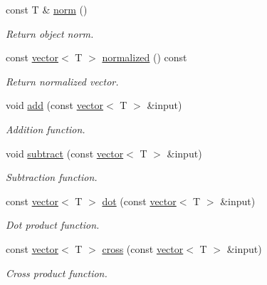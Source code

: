\begin{DoxyCompactItemize}
\mbox{\label{classddd_1_1vector_a77aea495c4aeaf8645d4ef94d1a0afb2}} 
const T \& \hyperlink{classddd_1_1vector_a77aea495c4aeaf8645d4ef94d1a0afb2}{norm} ()
\begin{DoxyCompactList}\small\item\em Return object norm. \end{DoxyCompactList}\item 
\mbox{\label{classddd_1_1vector_a40b593b08a2dd6af92c5c07bb9faa463}} 
const \hyperlink{classddd_1_1vector}{vector}$<$ T $>$ \hyperlink{classddd_1_1vector_a40b593b08a2dd6af92c5c07bb9faa463}{normalized} () const
\begin{DoxyCompactList}\small\item\em Return normalized vector. \end{DoxyCompactList}\item 
void \hyperlink{classddd_1_1vector_a97eca6a6625002022ab2442b5cbd0462}{add} (const \hyperlink{classddd_1_1vector}{vector}$<$ T $>$ \&input)
\begin{DoxyCompactList}\small\item\em Addition function. \end{DoxyCompactList}\item 
void \hyperlink{classddd_1_1vector_abf367c7da55ad2c770a90a3ed3c01d5a}{subtract} (const \hyperlink{classddd_1_1vector}{vector}$<$ T $>$ \&input)
\begin{DoxyCompactList}\small\item\em Subtraction function. \end{DoxyCompactList}\item 
const \hyperlink{classddd_1_1vector}{vector}$<$ T $>$ \hyperlink{classddd_1_1vector_a61e3ccdb85f4d41c142c80b429808baf}{dot} (const \hyperlink{classddd_1_1vector}{vector}$<$ T $>$ \&input)
\begin{DoxyCompactList}\small\item\em Dot product function. \end{DoxyCompactList}\item 
const \hyperlink{classddd_1_1vector}{vector}$<$ T $>$ \hyperlink{classddd_1_1vector_a27ac4cb7a469642d497cfe070935ab4b}{cross} (const \hyperlink{classddd_1_1vector}{vector}$<$ T $>$ \&input)
\begin{DoxyCompactList}\small\item\em Cross product function. \end{DoxyCompactList}\item 

\end{DoxyCompactItemize}
